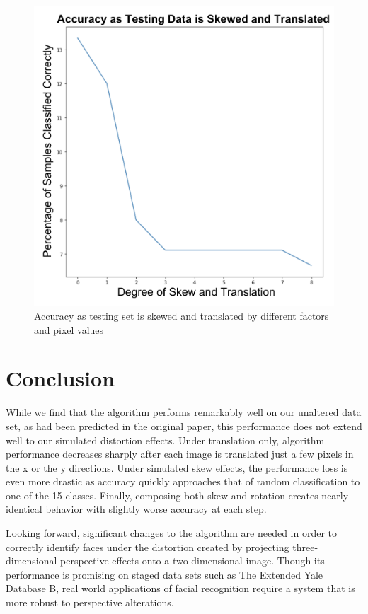 \documentclass{amsart}
\theoremstyle{definition}
\theoremstyle{remark}
\begin{document}
\begin{figure}
\caption{Accuracy as testing set is skewed and translated by different factors and pixel values}
\includegraphics[scale=0.25]{figures/SkewTranslation.png}
\end{figure}

\section{Conclusion}

While we find that the algorithm performs remarkably well on our unaltered data set, as had been predicted in the original paper, this performance does not extend well to our simulated distortion effects. Under translation only, algorithm performance decreases sharply after each image is translated just a few pixels in the x or the y directions. Under simulated skew effects, the performance loss is even more drastic as accuracy quickly approaches that of random classification to one of the 15 classes. Finally, composing both skew and rotation creates nearly identical behavior with slightly worse accuracy at each step.

Looking forward, significant changes to the algorithm are needed in order to correctly identify faces under the distortion created by projecting three-dimensional perspective effects onto a two-dimensional image. Though its performance is promising on staged data sets such as The Extended Yale Database B, real world applications of facial recognition require a system that is more robust to perspective alterations.
\end{document}
